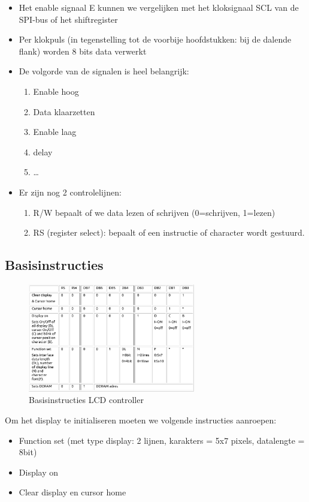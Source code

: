 \documentclass{article}
\begin{document}
\begin{itemize}
    \item Het enable signaal E kunnen we vergelijken met het kloksignaal SCL van de SPI-bus of het shiftregister
    \item Per klokpuls (in tegenstelling tot de voorbije hoofdstukken: bij de dalende flank) worden 8 bits data verwerkt
    \item De volgorde van de signalen is heel belangrijk:
    \begin{enumerate}
        \item Enable hoog
        \item Data klaarzetten
        \item Enable laag
        \item delay
        \item \dots
    \end{enumerate}
    \item Er zijn nog 2 controlelijnen:
    \begin{enumerate}
        \item R/W bepaalt of we data lezen of schrijven (0=schrijven, 1=lezen)
        \item RS (register select): bepaalt of een instructie of character wordt gestuurd. 
    \end{enumerate}
\end{itemize}

\subsection{Basisinstructies}
\begin{figure}[H]
    \centering
    \includegraphics[width=0.65\textwidth]{lcd-instructies.png}
    \caption{Basisinstructies LCD controller}
\end{figure}

Om het display te initialiseren moeten we volgende instructies aanroepen:
\begin{itemize}
    \item Function set (met type display: 2 lijnen, karakters = 5x7 pixels, datalengte = 8bit)
    \item Display on
    \item Clear display en cursor home
\end{itemize}
\end{document}
